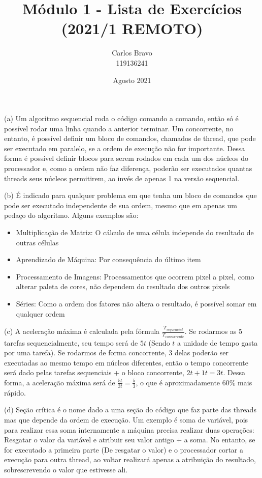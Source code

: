 \documentclass{homework}
\title{Módulo 1 - Lista de Exercícios (2021/1 REMOTO)}
\author{Carlos Bravo\\ 119136241}
\date{Agosto 2021}
\begin{document}
\maketitle
\exercise*

(a) Um algoritmo sequencial roda o código comando a comando, então só é possível rodar uma linha quando a anterior terminar. Um concorrente, no entanto, é possível definir um bloco de comandos, chamados de thread, que pode ser executado em paralelo, se a ordem de execução não for importante. Dessa forma é possível definir blocos para serem rodados em cada um dos núcleos do processador e, como a ordem não faz diferença, poderão ser executados quantas threads seus núcleos permitirem, ao invés de apenas 1 na versão sequencial.

(b) É indicado para qualquer problema em que tenha um bloco de comandos que pode ser executado independente de sua ordem, mesmo que em apenas um pedaço do algoritmo. Alguns exemplos são:
\begin{itemize}
    \item Multiplicação de Matriz: O cálculo de uma célula independe do resultado de outras células
    \item Aprendizado de Máquina: Por consequência do último item
    \item Processamento de Imagens: Processamentos que ocorrem pixel a pixel, como alterar paleta de cores, não dependem do resultado dos outros pixels
    \item Séries: Como a ordem dos fatores não altera o resultado, é possível somar em qualquer ordem
\end{itemize}

(c) A aceleração máxima é calculada pela fórmula $\frac{T_{sequencial}}{T_{concorrente}}$. Se rodarmos as 5 tarefas sequencialmente, seu tempo será de $5t$ (Sendo $t$ a unidade de tempo gasta por uma tarefa). Se rodarmos de forma concorrente, 3 delas poderão ser executadas ao mesmo tempo em núcleos diferentes, então o tempo concorrente será dado pelas tarefas sequenciais + o bloco concorrente, $2t + 1t = 3t$. Dessa forma, a aceleração máxima será de $\frac{5t}{3t} = \frac{5}{3}$, o que é aproximadamente $60\%$ mais rápido.

(d) Seção crítica é o nome dado a uma seção do código que faz parte das threads mas que depende da ordem de execução. Um exemplo é soma de variável, pois para realizar essa soma internamente a máquina precisa realizar duas operações: Resgatar o valor da variável e atribuir seu valor antigo + a soma. No entanto, se for executado a primeira parte (De resgatar o valor) e o processador cortar a execução para outra thread, ao voltar realizará apenas a atribuição do resultado, sobrescrevendo o valor que estivesse ali.
\end{document}
